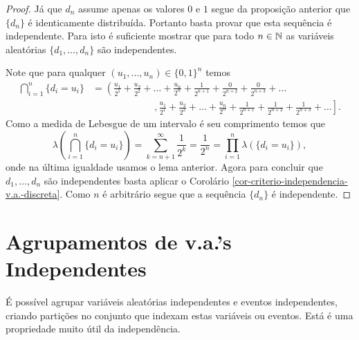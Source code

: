 \begin{proof}
Já que $d_n$ assume apenas os valores $0$ e $1$ segue da
proposição anterior que $\{d_n\}$ é identicamente distribuída.
Portanto basta provar que esta sequência é independente. 
Para isto é suficiente mostrar que para todo $n\in\mathbb{N}$ 
as variáveis aleatórias $\{d_1,\ldots,d_n\}$ são independentes.

Note que para qualquer $(u_1,\ldots,u_n)\in \{0,1\}^n$
temos 
	\begin{align*}
		\bigcap_{i=1}^{n} \{d_i=u_i\}
		&=
		\left(
		\frac{u_1}{2^1}+\frac{u_2}{2^2}+\ldots+\frac{u_{n}}{2^{n}}+\frac{1}{2^{n+1}}
		+\frac{0}{2^{n+2}}+\frac{0}{2^{n+3}}+
		\ldots
		\right.
		\\
		&\qquad\qquad\qquad
		\ \ \mathbf{,} 
		\left.
		\frac{u_1}{2^1}+\frac{u_2}{2^2}+\ldots+\frac{u_{n}}{2^{n}}+\frac{1}{2^{n+1}}
		+\frac{1}{2^{n+2}}+\frac{1}{2^{n+3}}+
		\ldots
		\right].
	\end{align*}
Como a medida de Lebesgue de um intervalo é seu comprimento temos que  
	\[
		\lambda
		\left( 
				\bigcap_{i=1}^{n} \{d_i=u_i\}
		\right)
		=
		\sum_{k=n+1}^{\infty} \frac{1}{2^k}
		=
		\frac{1}{2^n}
		=
		\prod_{i=1}^n \lambda(\{d_i=u_i\}),
	\]
onde na última igualdade usamos o lema anterior.
Agora para concluir que $d_1,\ldots,d_n$ são independentes
basta aplicar o Corolário 
\ref{cor-criterio-independencia-v.a.-discreta}.
Como $n$ é arbitrário segue que a sequência 
$\{d_n\}$ é independente.
\end{proof}


















\section{Agrupamentos de v.a.'s Independentes}


É possível agrupar variáveis aleatórias independentes
e eventos independentes, criando partições no conjunto
que indexam estas variáveis ou eventos. Está é uma
propriedade muito útil da independência.

